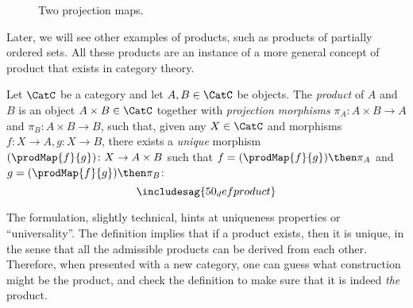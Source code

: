\begin{figure}[h!]
    \centering
    \caption{Two projection maps. \label{fig:resource-product}}
\end{figure}


Later, we will see other examples of products, such as products of partially ordered sets.
All these products are an instance of a more general concept of product that exists in category
theory.
 
\begin{shaded}
\begin{definition}
Let $\CatC$ be a category and let $A,B\in \CatC$ be objects. The \emph{product} of $A$ and $B$ is an object $A \times B \in \CatC$ together with \emph{projection morphisms} $\pi_A \colon A \times B \to A$ and $\pi_B \colon A \times B \to B$, such that, given any $X \in \CatC$ and morphisms $f \colon X \to A, g \colon X \to B$, there exists a \emph{unique} morphism $(\prodMap{f}{g}) \colon X \to A \times B$ such that $f = (\prodMap{f}{g})\then \pi_A$ and $g=(\prodMap{f}{g})\then \pi_B$:
\begin{equation}
\includesag{50_defproduct}
\end{equation}
\end{definition}
\end{shaded}

The formulation, slightly technical, hints at uniqueness properties or ``universality''.
The definition implies that if a product exists, then it is unique, in the sense
that all the admissible products can be derived from each other. Therefore, when
presented with a new category, one can guess what construction might be the product, and check
the definition to make sure that it is indeed \emph{the} product.


